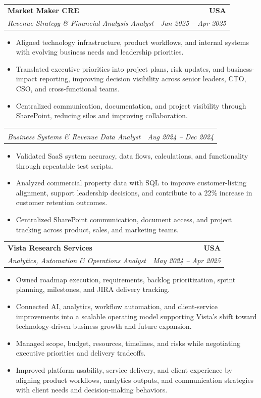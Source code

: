 \documentclass[letterpaper,10pt]{article}
\makeatletter
\newcommand{\resumeItem}[1]{\item \small{#1}}
\newcommand{\resumeSubheading}[4]{
  \vspace{1pt}\item
    \begin{tabular*}{1.0\textwidth}[t]{l@{\extracolsep{\fill}}r}
      \textbf{#1} & \textbf{\small #2} \\
      \textit{\small #3} & \textit{\small #4} \\
    \end{tabular*}\vspace{-6pt}
}
\newcommand{\resumeItemListStart}{\begin{itemize}[leftmargin=0.15in, itemsep=1pt, topsep=3pt]}
\newcommand{\resumeItemListEnd}{\end{itemize}\vspace{-2pt}}
\makeatother
\begin{document}
\vspace{-2pt}

\resumeSubheading
{Market Maker CRE}{USA}
{Revenue Strategy \& Financial Analysis Analyst}{Jan 2025 -- Apr 2025}
\resumeItemListStart
\resumeItem{Aligned technology infrastructure, product workflows, and internal systems with evolving business needs and leadership priorities.}
\resumeItem{Translated executive priorities into project plans, risk updates, and business-impact reporting, improving decision visibility across senior leaders, CTO, CSO, and cross-functional teams.}
\resumeItem{Centralized communication, documentation, and project visibility through SharePoint, reducing silos and improving collaboration.}
\resumeItemListEnd

\vspace{-12pt}

\resumeSubheading
{}{}
{Business Systems \& Revenue Data Analyst}{Aug 2024 -- Dec 2024}
\resumeItemListStart
\resumeItem{Validated SaaS system accuracy, data flows, calculations, and functionality through repeatable test scripts.}
\resumeItem{Analyzed commercial property data with SQL to improve customer-listing alignment, support leadership decisions, and contribute to a 22\% increase in customer retention outcomes.}
\resumeItem{Centralized SharePoint communication, document access, and project tracking across product, sales, and marketing teams.}
\resumeItemListEnd

\vspace{-2pt}

\resumeSubheading
{Vista Research Services}{USA}
{Analytics, Automation \& Operations Analyst}{May 2024 -- Apr 2025}
\resumeItemListStart
\resumeItem{Owned roadmap execution, requirements, backlog prioritization, sprint planning, milestones, and JIRA delivery tracking.}
\resumeItem{Connected AI, analytics, workflow automation, and client-service improvements into a scalable operating model supporting Vista’s shift toward technology-driven business growth and future expansion.}
\resumeItem{Managed scope, budget, resources, timelines, and risks while negotiating executive priorities and delivery tradeoffs.}
\resumeItem{Improved platform usability, service delivery, and client experience by aligning product workflows, analytics outputs, and communication strategies with client needs and decision-making behaviors.}
\resumeItemListEnd

\vspace{-2pt}
\end{document}
